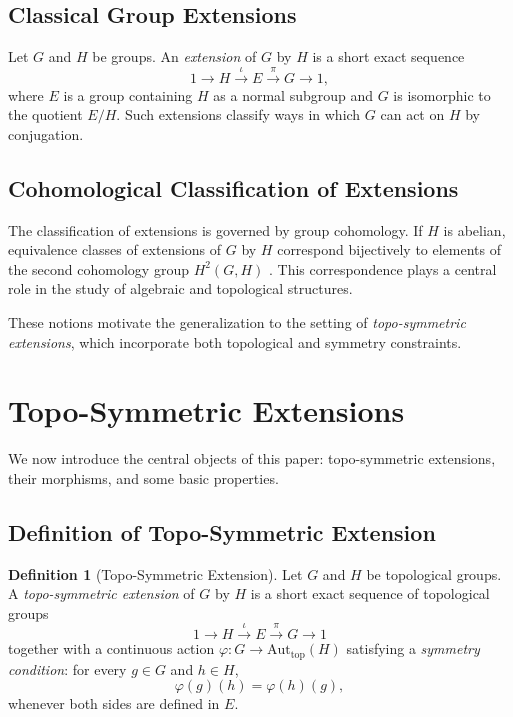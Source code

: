 \documentclass[11pt,a4paper]{article}
\theoremstyle{plain}
\theoremstyle{definition}
\newtheorem{definition}[theorem]{Definition}
\theoremstyle{remark}
\begin{document}
	\subsection{Classical Group Extensions}
	Let $G$ and $H$ be groups. 
	An \emph{extension} of $G$ by $H$ is a short exact sequence
	\[
	1 \longrightarrow H \overset{\iota}{\longrightarrow} E \overset{\pi}{\longrightarrow} G \longrightarrow 1,
	\]
	where $E$ is a group containing $H$ as a normal subgroup and $G$ is isomorphic to the quotient $E/H$.  
	Such extensions classify ways in which $G$ can act on $H$ by conjugation.
	
	\subsection{Cohomological Classification of Extensions}
	The classification of extensions is governed by group cohomology. 
	If $H$ is abelian, equivalence classes of extensions of $G$ by $H$ correspond bijectively to elements of the second cohomology group $H^2(G,H)$ \cite{EilenbergMacLane1947, MacLane1963, Brown1982}.  
	This correspondence plays a central role in the study of algebraic and topological structures.
	
	\medskip
	
	These notions motivate the generalization to the setting of \emph{topo-symmetric extensions}, 
	which incorporate both topological and symmetry constraints.
	
	\section{Topo-Symmetric Extensions}
	
	We now introduce the central objects of this paper: topo-symmetric extensions, their morphisms, and some basic properties.
	
	\subsection{Definition of Topo-Symmetric Extension}
	
	\begin{definition}[Topo-Symmetric Extension]
		Let $G$ and $H$ be topological groups. 
		A \emph{topo-symmetric extension} of $G$ by $H$ is a short exact sequence of topological groups
		\[
		1 \longrightarrow H \overset{\iota}{\longrightarrow} E \overset{\pi}{\longrightarrow} G \longrightarrow 1
		\]
		together with a continuous action $\varphi : G \to \mathrm{Aut}_{\mathrm{top}}(H)$ satisfying a \emph{symmetry condition}:
		for every $g \in G$ and $h \in H$,
		\[
		\varphi(g)(h) = \varphi(h)(g),
		\]
		whenever both sides are defined in $E$. 
	\end{definition}
	
\end{document}
